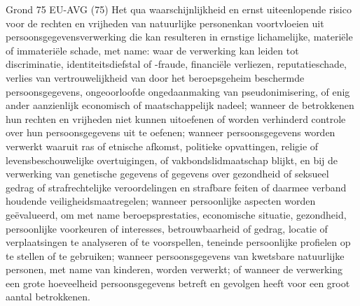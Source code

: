 Grond 75
EU-AVG
(75) Het qua waarschijnlijkheid en ernst uiteenlopende risico voor de rechten en vrijheden van natuurlijke personenkan voortvloeien uit persoonsgegevensverwerking die kan resulteren in ernstige lichamelijke, materiële of immateriële schade, met name: waar de verwerking kan leiden tot discriminatie, identiteitsdiefstal of -fraude, financiële verliezen, reputatieschade, verlies van vertrouwelijkheid van door het beroepsgeheim beschermde persoonsgegevens, ongeoorloofde ongedaanmaking van pseudonimisering, of enig ander aanzienlijk economisch of maatschappelijk nadeel; wanneer de betrokkenen hun rechten en vrijheden niet kunnen uitoefenen of worden verhinderd controle over hun persoonsgegevens uit te oefenen; wanneer persoonsgegevens worden verwerkt waaruit ras of etnische afkomst, politieke opvattingen, religie of levensbeschouwelijke overtuigingen, of vakbondslidmaatschap blijkt, en bij de verwerking van genetische gegevens of gegevens over gezondheid of seksueel gedrag of strafrechtelijke veroordelingen en strafbare feiten of daarmee verband houdende veiligheidsmaatregelen; wanneer persoonlijke aspecten worden geëvalueerd, om met name beroepsprestaties, economische situatie, gezondheid, persoonlijke voorkeuren of interesses, betrouwbaarheid of gedrag, locatie of verplaatsingen te analyseren of te voorspellen, teneinde persoonlijke profielen op te stellen of te gebruiken; wanneer persoonsgegevens van kwetsbare natuurlijke personen, met name van kinderen, worden verwerkt; of wanneer de verwerking een grote hoeveelheid persoonsgegevens betreft en gevolgen heeft voor een groot aantal betrokkenen.